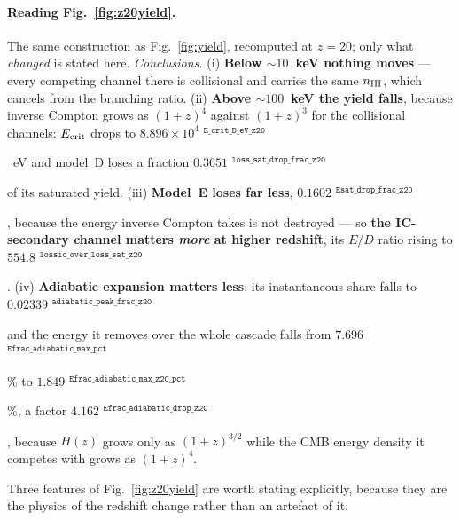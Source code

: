 \documentclass[11pt,a4paper]{article}
\newif\ifprovdraft
\newcommand{\src}[1]{%
  \ifprovdraft
    \ifmmode{}^{\text{\color{gray}\scriptsize\texttt{#1}}}%
    \else{\color{gray}\scriptsize$^{\texttt{#1}}$}%
    \fi
  \fi}
\begin{document}
\paragraph{Reading Fig.~\ref{fig:z20yield}.} The same construction as
Fig.~\ref{fig:yield}, recomputed at $z=20$; only what \emph{changed} is stated
here. \emph{Conclusions.} (i) \textbf{Below $\sim10$~keV nothing moves} ---
every competing channel there is collisional and carries the same $n_{\rm HI}$,
which cancels from the branching ratio. (ii) \textbf{Above
$\sim100$~keV the yield falls}, because inverse Compton grows as $(1+z)^4$
against $(1+z)^3$ for the collisional channels: $E_{\rm crit}$ drops to
$8.896\times10^{4}$\src{E\_crit\_D\_eV\_z20}~eV and model~D loses a fraction
$0.3651$\src{loss\_sat\_drop\_frac\_z20} of its saturated yield. (iii)
\textbf{Model~E loses far less}, $0.1602$\src{Esat\_drop\_frac\_z20}, because
the energy inverse Compton takes is not destroyed --- so \textbf{the
IC-secondary channel matters \emph{more} at higher redshift}, its $E/D$ ratio
rising to $554.8$\src{lossic\_over\_loss\_sat\_z20}. (iv) \textbf{Adiabatic expansion
matters less}: its instantaneous share falls to
$0.02339$\src{adiabatic\_peak\_frac\_z20} and the energy it removes over the
whole cascade falls from $7.696$\src{Efrac\_adiabatic\_max\_pct}\% to
$1.849$\src{Efrac\_adiabatic\_max\_z20\_pct}\%, a factor
$4.162$\src{Efrac\_adiabatic\_drop\_z20}, because $H(z)$ grows only as
$(1+z)^{3/2}$ while the CMB energy density it competes with grows as $(1+z)^4$.


Three features of Fig.~\ref{fig:z20yield} are worth stating explicitly, because
they are the physics of the redshift change rather than an artefact of it.
\end{document}
